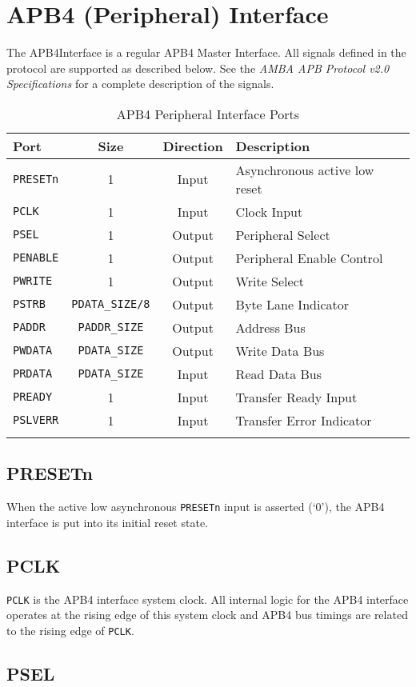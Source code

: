 \section{APB4 (Peripheral)
Interface}\label{apb4-peripheral-interface}

The APB4Interface is a regular APB4 Master Interface. All signals
defined in the protocol are supported as described below. See the
\emph{AMBA APB Protocol v2.0 Specifications} for a complete description
of the signals.

\begin{longtable}[]{@{}lccl@{}}
\toprule
\textbf{Port} & \textbf{Size} & \textbf{Direction} & \textbf{Description}\tabularnewline
\midrule
\endhead
\texttt{PRESETn} & 1 & Input & Asynchronous active low reset\tabularnewline
\texttt{PCLK} & 1 & Input & Clock Input\tabularnewline
\texttt{PSEL} & 1 & Output & Peripheral Select\tabularnewline
\texttt{PENABLE} & 1 & Output & Peripheral Enable Control\tabularnewline
\texttt{PWRITE} & 1 & Output & Write Select\tabularnewline
\texttt{PSTRB} & \texttt{PDATA\_SIZE/8} & Output & Byte Lane Indicator\tabularnewline
\texttt{PADDR} & \texttt{PADDR\_SIZE} & Output & Address Bus\tabularnewline
\texttt{PWDATA} & \texttt{PDATA\_SIZE} & Output & Write Data Bus\tabularnewline
\texttt{PRDATA} & \texttt{PDATA\_SIZE} & Input & Read Data Bus\tabularnewline
\texttt{PREADY} & 1 & Input & Transfer Ready Input\tabularnewline
\texttt{PSLVERR} & 1 & Input & Transfer Error Indicator\tabularnewline
\bottomrule
\caption{APB4 Peripheral Interface Ports}
\end{longtable}

\subsection{PRESETn}\label{presetn}

When the active low asynchronous \texttt{PRESETn} input is asserted (`0'), the
APB4 interface is put into its initial reset state.

\subsection{PCLK}\label{pclk}

\texttt{PCLK} is the APB4 interface system clock. All internal logic for the APB4
interface operates at the rising edge of this system clock and APB4 bus
timings are related to the rising edge of \texttt{PCLK}.

\subsection{PSEL}\label{psel}

